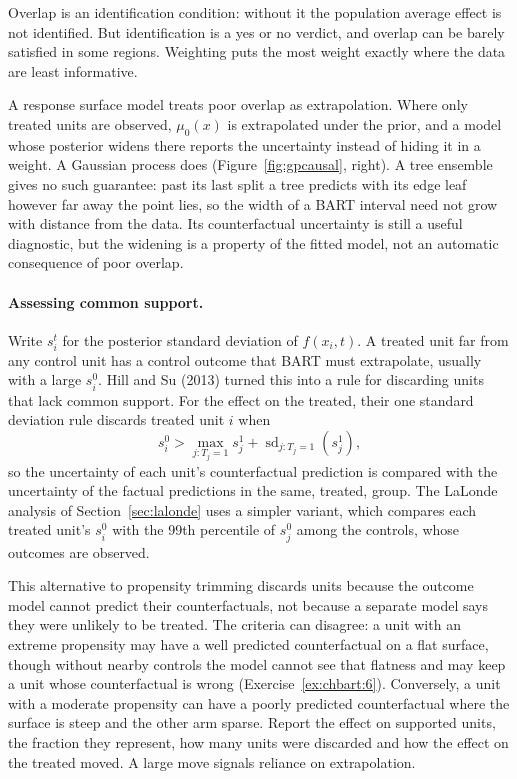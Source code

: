 Overlap is an identification condition: without it the population average effect is not identified. But identification is a yes or no verdict, and overlap can be barely satisfied in some regions. Weighting puts the most weight exactly where the data are least informative.

A response surface model treats poor overlap as extrapolation. Where only treated units are observed, $\mu_0(x)$ is extrapolated under the prior, and a model whose posterior widens there reports the uncertainty instead of hiding it in a weight. A Gaussian process does (Figure~\ref{fig:gpcausal}, right). A tree ensemble gives no such guarantee: past its last split a tree predicts with its edge leaf however far away the point lies, so the width of a BART interval need not grow with distance from the data. Its counterfactual uncertainty is still a useful diagnostic, but the widening is a property of the fitted model, not an automatic consequence of poor overlap.

\paragraph{Assessing common support.} Write $s_i^t$ for the posterior standard deviation of $f(x_i, t)$. A treated unit far from any control unit has a control outcome that BART must extrapolate, usually with a large $s_i^0$. Hill and Su (2013) turned this into a rule for discarding units that lack common support. For the effect on the treated, their one standard deviation rule discards treated unit $i$ when
\[
s_i^0 > \max_{j: T_j = 1} s_j^1 + \operatorname{sd}_{j: T_j = 1}(s_j^1),
\]
so the uncertainty of each unit's counterfactual prediction is compared with the uncertainty of the factual predictions in the same, treated, group. The LaLonde analysis of Section~\ref{sec:lalonde} uses a simpler variant, which compares each treated unit's $s_i^0$ with the 99th percentile of $s_j^0$ among the controls, whose outcomes are observed.

This alternative to propensity trimming discards units because the outcome model cannot predict their counterfactuals, not because a separate model says they were unlikely to be treated. The criteria can disagree: a unit with an extreme propensity may have a well predicted counterfactual on a flat surface, though without nearby controls the model cannot see that flatness and may keep a unit whose counterfactual is wrong (Exercise~\ref{ex:chbart:6}). Conversely, a unit with a moderate propensity can have a poorly predicted counterfactual where the surface is steep and the other arm sparse. Report the effect on supported units, the fraction they represent, how many units were discarded and how the effect on the treated moved. A large move signals reliance on extrapolation.

